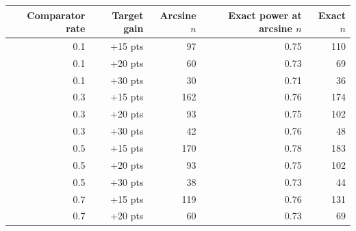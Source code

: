 \begin{tabular}{@{}rrrrr@{}}
\toprule
Comparator rate & Target gain & Arcsine $n$ & Exact power at arcsine $n$ & Exact $n$\\ \midrule
0.1 & +15 pts & 97 & 0.75 & 110\\
0.1 & +20 pts & 60 & 0.73 & 69\\
0.1 & +30 pts & 30 & 0.71 & 36\\
0.3 & +15 pts & 162 & 0.76 & 174\\
0.3 & +20 pts & 93 & 0.75 & 102\\
0.3 & +30 pts & 42 & 0.76 & 48\\
0.5 & +15 pts & 170 & 0.78 & 183\\
0.5 & +20 pts & 93 & 0.75 & 102\\
0.5 & +30 pts & 38 & 0.73 & 44\\
0.7 & +15 pts & 119 & 0.76 & 131\\
0.7 & +20 pts & 60 & 0.73 & 69\\
\bottomrule
\end{tabular}
